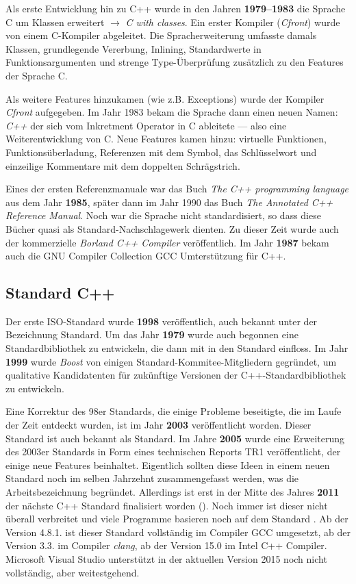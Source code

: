 Als erste Entwicklung hin zu C++ wurde in den Jahren \textbf{1979--1983} die Sprache C um Klassen erweitert $\rightarrow$ \textit{C with classes}. Ein erster Kompiler (\textit{Cfront}) wurde von einem C-Kompiler abgeleitet. Die Spracherweiterung umfasste damals Klassen, grundlegende Vererbung, Inlining, Standardwerte in Funktionsargumenten und strenge Type-Überprüfung zusätzlich zu den Features der Sprache C.

Als weitere Features hinzukamen (wie z.B. Exceptions) wurde der Kompiler \textit{Cfront} aufgegeben. Im Jahr 1983 bekam die Sprache dann einen neuen Namen: \textit{C++} der sich vom Inkretment Operator in C ableitete --- also eine Weiterentwicklung von C. Neue Features kamen hinzu: virtuelle Funktionen, Funktionsüberladung, Referenzen mit dem \cpp{&} Symbol, das Schlüsselwort  und einzeilige Kommentare mit dem doppelten Schrägstrich.

Eines der ersten Referenzmanuale war das Buch \textit{The C++ programming language} aus dem Jahr \textbf{1985}, später dann im Jahr 1990 das Buch \textit{The Annotated C++ Reference Manual}. Noch war die Sprache nicht standardisiert, so dass diese Bücher quasi als Standard-Nachschlagewerk dienten. Zu dieser Zeit wurde auch der kommerzielle \textit{Borland C++ Compiler} veröffentlich. Im Jahr \textbf{1987} bekam auch die GNU Compiler Collection GCC Umterstützung für C++.

\subsection{Standard C++}
Der erste ISO-Standard wurde \textbf{1998} veröffentlich, auch bekannt unter der Bezeichnung  Standard. Um das Jahr \textbf{1979} wurde auch begonnen eine Standardbibliothek zu entwickeln, die dann mit in den Standard einfloss. Im Jahr \textbf{1999} wurde \textit{Boost} von einigen Standard-Kommitee-Mitgliedern gegründet, um qualitative Kandidatenten für zukünftige Versionen der C++-Standardbibliothek zu entwickeln.

Eine Korrektur des 98er Standards, die einige Probleme beseitigte, die im Laufe der Zeit entdeckt wurden, ist im Jahr \textbf{2003} veröffentlicht worden. Dieser Standard ist auch bekannt als  Standard. Im Jahre \textbf{2005} wurde eine Erweiterung des 2003er Standards in Form eines technischen Reports TR1 veröffentlicht, der einige neue Features beinhaltet. Eigentlich sollten diese Ideen in einem neuen Standard noch im selben Jahrzehnt zusammengefasst werden, was die Arbeitsbezeichnung  begründet. Allerdings ist erst in der Mitte des Jahres \textbf{2011} der nächste C++ Standard finalisiert worden (). Noch immer ist dieser nicht überall verbreitet und viele Programme basieren noch auf dem Standard . Ab der Version 4.8.1. ist dieser Standard vollständig im Compiler GCC umgesetzt, ab der Version 3.3. im Compiler \textit{clang}, ab der Version 15.0 im Intel C++ Compiler. Microsoft Visual Studio unterstützt  in der aktuellen Version 2015 noch nicht vollständig, aber weitestgehend.

